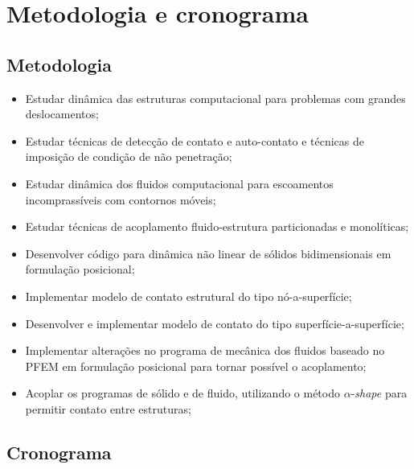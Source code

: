 \documentclass[_ArquivoPrincipal.tex]{subfiles}
\begin{document}
	
\chapter{Metodologia e cronograma}


\section{Metodologia}

\begin{itemize}
	\item Estudar dinâmica das estruturas computacional para problemas com grandes deslocamentos;
	
	\item Estudar técnicas de detecção de contato e auto-contato e técnicas de imposição de condição de não penetração;
	
	\item Estudar dinâmica dos fluidos computacional para escoamentos incomprassíveis com contornos móveis;
	
	\item Estudar técnicas de acoplamento fluido-estrutura particionadas e monolíticas;
	
	\item Desenvolver código para dinâmica não linear de sólidos bidimensionais em formulação posicional;
	
	\item Implementar modelo de contato estrutural do tipo nó-a-superfície;
	
	\item Desenvolver e implementar modelo de contato do tipo superfície-a-superfície;
	
	\item Implementar alterações no programa de mecânica dos fluidos baseado no PFEM em formulação posicional para tornar possível o acoplamento;
	
	\item Acoplar os programas de sólido e de fluido, utilizando o método $\alpha$-\textit{shape} para permitir contato entre estruturas;

\end{itemize}


\section{Cronograma}
\end{document}
